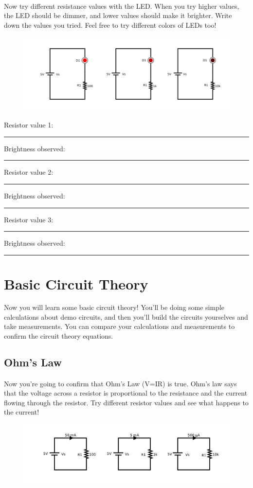 \documentclass{article}
\begin{document}
\paragraph{}
Now try different resistance values with the LED. When you try higher values, the LED should be dimmer, and lower values should make it brighter. Write down the values you tried. Feel free to try different colors of LEDs too!
\begin{figure}[H]
  \centering
  \includegraphics[width=0.6\linewidth]{pngs/05-led-multiple-resistances.png}
\end{figure}
\noindent
Resistor value 1: \rule{4cm}{0.15mm} Brightness observed: \rule{4cm}{0.15mm}
\newline
\newline
Resistor value 2: \rule{4cm}{0.15mm} Brightness observed: \rule{4cm}{0.15mm}
\newline
\newline
Resistor value 3: \rule{4cm}{0.15mm} Brightness observed: \rule{4cm}{0.15mm}

\newpage
\section{Basic Circuit Theory}
Now you will learn some basic circuit theory! You'll be doing some simple calculations about demo circuits, and then you'll build the circuits yourselves and take measurements. You can compare your calculations and measurements to confirm the circuit theory equations.

\subsection{Ohm's Law}
\paragraph{}
Now you're going to confirm that Ohm's Law (V=IR) is true. Ohm's law says that the voltage across a resistor is proportional to the resistance and the current flowing through the resistor. Try different resistor values and see what happens to the current!
\begin{figure}[H]
  \centering
  \includegraphics[width=0.8\linewidth]{pngs/06-resistor-current-measurement.png}
\end{figure}
\end{document}

